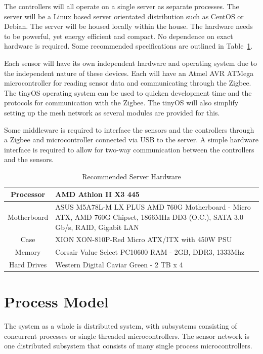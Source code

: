 \documentclass{report}
\begin{document}
The controllers will all operate on a single server as separate processes. The
server will be a Linux based server orientated distribution such as CentOS or
Debian. The server will be housed locally within the house. The hardware needs
to be powerful, yet energy efficient and compact. No dependence on exact
hardware is required. Some recommended specifications are outlined in
Table~\ref{server_hardware}.

Each sensor will have its own independent hardware and operating system due to
the independent nature of these devices. Each will have an Atmel AVR ATMega
microcontroller for reading sensor data and communicating through the Zigbee.
The tinyOS operating system can be used to quicken development time and the
protocols for communication with the Zigbee. The tinyOS will also simplify
setting up the mesh network as several modules are provided for this.

Some middleware is required to interface the sensors and the controllers
through a Zigbee and microcontroller connected via USB to the server. A simple
hardware interface is required to allow for two-way communication between the
controllers and the sensors.

\begin{table}[h]
    \caption{Recommended Server Hardware}
    \label{server_hardware}
    \centering
    \begin{tabular}{| c | p{5cm} |}
    \hline
    Processor & AMD Athlon II X3 445 \\ \hline
    Motherboard & ASUS M5A78L-M LX PLUS AMD 760G Motherboard - Micro ATX,
    AMD 760G Chipset, 1866MHz DD3 (O.C.), SATA 3.0 Gb/s, RAID, Gigabit LAN \\
    \hline
    Case &  XION XON-810P-Red Micro ATX/ITX with 450W PSU \\ \hline
    Memory & Corsair Value Select PC10600 RAM - 2GB, DDR3, 1333Mhz \\ \hline
    Hard Drives & Western Digital Caviar Green - 2 TB x 4 \\
    \hline
    \end{tabular}
\end{table}


\section{Process Model}
The system as a whole is distributed system, with subsystems consisting of
concurrent processes or single threaded microcontrollers. The sensor network is
one distributed subsystem that consists of many single process
microcontrollers. 
\end{document}
